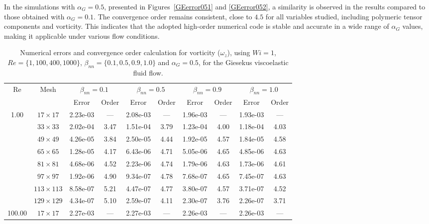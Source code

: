 \documentclass[preprint, 12pt]{elsarticle}
\begin{document}
In the simulations with $\alpha_G = 0.5$, presented in Figures~\ref{GEerror051} and \ref{GEerror052}, a similarity is observed in the results compared to those obtained with $\alpha_G = 0.1$. The convergence order remains consistent, close to $4.5$ for all variables studied, including polymeric tensor components and vorticity. This indicates that the adopted high-order numerical code is stable and accurate in a wide range of $\alpha_G$ values, making it applicable under various flow conditions. \begin{center}
\begin{table}[H]
\caption{Numerical errors and convergence order calculation for vorticity ($\omega_{z}$), using \mbox{$Wi=1$}, $Re=\{1,100,400,1000\}$, $\beta_{nn}=\{0.1,0.5,0.9,1.0\}$ and $\alpha_G = 0.5$, for the Giesekus viscoelastic fluid flow.\label{tab_GiesekusWzalphaG05Resumida}}
\scriptsize{
    \begin{tabular*}{\textwidth}{@{\extracolsep\fill}cccccccccc@{}}
    \hline
    \multirow{2}{*}{$\operatorname{Re}$} & \multirow{2}{*}{Mesh} & \multicolumn{2}{c}{$\beta_{nn}=0.1$}  & \multicolumn{2}{c}{$\beta_{nn}=0.5$}  & \multicolumn{2}{c}{$\beta_{nn}=0.9$}  & \multicolumn{2}{c}{$\beta_{nn}=1.0$}\\ %
     & & Error & Order & Error & Order & Error & Order & Error & Order \\
    \hline
    \multirow{7}{*}{1.00} & $17\times 17$ & 2.23e-03 & --- & 2.08e-03 & --- & 1.96e-03 & --- & 1.93e-03 & --- \\
    & $33\times 33$ & 2.02e-04 & 3.47 & 1.51e-04 & 3.79 & 1.23e-04 & 4.00 & 1.18e-04 & 4.03 \\
    & $49\times 49$ & 4.26e-05 & 3.84 & 2.50e-05 & 4.44 & 1.92e-05 & 4.57 & 1.84e-05 & 4.58 \\
    & $65\times 65$ & 1.28e-05 & 4.17 & 6.43e-06 & 4.71 & 5.05e-06 & 4.65 & 4.85e-06 & 4.63 \\
    & $81\times 81$ & 4.68e-06 & 4.52 & 2.23e-06 & 4.74 & 1.79e-06 & 4.63 & 1.73e-06 & 4.61 \\
    & $97\times 97$ & 1.92e-06 & 4.90 & 9.34e-07 & 4.78 & 7.68e-07 & 4.65 & 7.45e-07 & 4.63 \\
    & $113\times 113$ & 8.58e-07 & 5.21 & 4.47e-07 & 4.77 & 3.80e-07 & 4.57 & 3.71e-07 & 4.52 \\
    & $129\times 129$ & 4.34e-07 & 5.10 & 2.59e-07 & 4.11 & 2.30e-07 & 3.76 & 2.26e-07 & 3.71 \\
    \hline\hline
    \multirow{7}{*}{100.00} & $17\times 17$ & 2.27e-03 & --- & 2.27e-03 & --- & 2.26e-03 & --- & 2.26e-03 & --- \\

\end{tabular*}}
\end{table}
\end{center}
\end{document}
